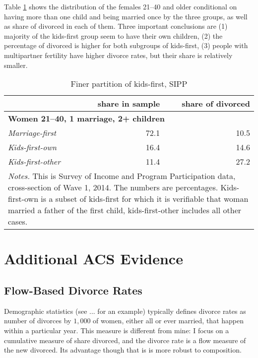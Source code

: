 \documentclass[12pt,letter]{article}
\begin{document}
Table \ref{fine_table} shows the distribution of the females 21--40 and older conditional on having more than one child and being married once by the three groups, as well as share of divorced in each of them. Three important conclusions are (1) majority of the kids-first group seem to have their own children, (2) the percentage of divorced is higher for both subgroups of kids-first, (3) people with multipartner fertility have higher divorce rates, but their share is relatively smaller.

\begin{table}[h!]
\caption{Finer partition of kids-first, SIPP\label{fine_table}}
\begin{center}
\begin{tabular}{l r r}
\hline
& share in sample & share of divorced  \\\hline
\multicolumn{3}{l}{\textbf{Women 21--40, 1 marriage, 2+ children}} \\\hline
\textit{Marriage-first} & 72.1 & 10.5 \\
\textit{Kids-first-own} &  16.4 & 14.6 \\
\textit{Kids-first-other} &  11.4 & 27.2 \\\hline
\multicolumn{3}{p{0.6\linewidth}}{ \footnotesize \textit{Notes.} This is Survey of Income and Program Participation data, cross-section of Wave 1, 2014. The numbers are percentages. Kids-first-own is a subset of kids-first for which it is verifiable that woman married a father of the first child, kids-first-other includes all other cases.} \\\hline
\end{tabular}
\end{center}
\end{table}

\newpage
\appendix

\section{Additional ACS Evidence}
\subsection{Flow-Based Divorce Rates}
Demographic statistics (see ... for an example) typically defines divorce rates as number of divorces by $1{,}000$ of women, either all or ever married, that happen within a particular year. This measure is different from mine: I focus on a cumulative measure of share divorced, and the divorce rate is a flow measure of the new divorced. Its advantage though that is is more robust to composition. 
\end{document}
